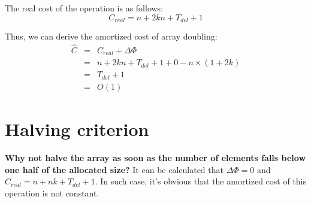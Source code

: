   The real cost of the operation is as follows:
  \[
  C_{real} = n + 2kn + T_{del} + 1
  \]

  Thus, we can derive the amortized cost of array doubling:
  \[
  \begin{array}{lcl}
  \hat C & = & C_{real} + \Delta \Phi \\
         & = & n + 2kn + T_{del} + 1 + 0 - n \times (1 + 2k) \\
         & = & T_{del} + 1 \\
         & = & O(1)
  \end{array}
  \]

\section{Halving criterion}
  \textbf{Why not halve the array as soon as the number of elements falls below one half of the allocated size?}
  It can be calculated that $\Delta \Phi = 0$ and $C_{real} = n + nk + T_{del} + 1$. In such case, it's obvious that the amortized cost of this operation is not constant.
